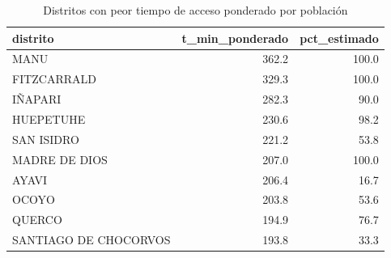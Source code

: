 \begin{table}
\caption{Distritos con peor tiempo de acceso ponderado por población}
\label{tab:critical_districts}
\begin{tabular}{lrr}
\toprule
distrito & t\_min\_ponderado & pct\_estimado \\
\midrule
MANU & 362.2 & 100.0 \\
FITZCARRALD & 329.3 & 100.0 \\
IÑAPARI & 282.3 & 90.0 \\
HUEPETUHE & 230.6 & 98.2 \\
SAN ISIDRO & 221.2 & 53.8 \\
MADRE DE DIOS & 207.0 & 100.0 \\
AYAVI & 206.4 & 16.7 \\
OCOYO & 203.8 & 53.6 \\
QUERCO & 194.9 & 76.7 \\
SANTIAGO DE CHOCORVOS & 193.8 & 33.3 \\
\bottomrule
\end{tabular}
\end{table}
